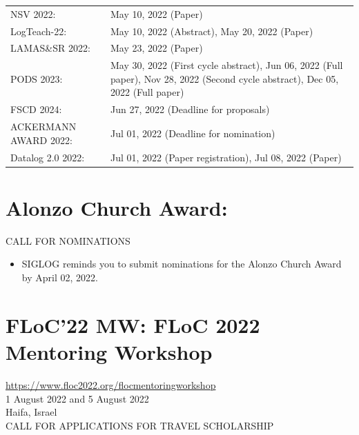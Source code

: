 \documentclass[prodmode,acmtecs]{acmsmall} %
\begin{document}
\begin{tabulary}{\linewidth}{LL}
NSV 2022:  & May 10, 2022 (Paper) \\
LogTeach-22:  & May 10, 2022 (Abstract), May 20, 2022 (Paper) \\
LAMAS\&SR 2022:  & May 23, 2022 (Paper) \\
PODS 2023:  & May 30, 2022 (First cycle abstract), Jun 06, 2022 (Full paper), Nov 28, 2022 (Second cycle abstract), Dec 05, 2022 (Full paper) \\
FSCD 2024:  & Jun 27, 2022 (Deadline for proposals) \\
ACKERMANN AWARD 2022:  & Jul 01, 2022 (Deadline for nomination) \\
Datalog 2.0 2022:  & Jul 01, 2022 (Paper registration), Jul 08, 2022 (Paper) \\
\end{tabulary}
\section{Alonzo Church Award:}\label{AlonzoChurchAward}CALL FOR NOMINATIONS 

\begin{itemize}\item  SIGLOG reminds you to submit nominations for the Alonzo Church Award by April 02, 2022. 
 
\end{itemize}\section{FLoC'22 MW: FLoC 2022 Mentoring Workshop}\label{FLoC22MW}  \href{https://www.floc2022.org/flocmentoringworkshop}{https://www.floc2022.org/flocmentoringworkshop}\\ 
  1 August 2022 and 5 August 2022\\ 
  Haifa, Israel\\ 
CALL FOR APPLICATIONS FOR TRAVEL SCHOLARSHIP 
\end{document}
